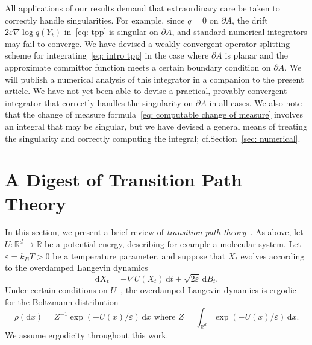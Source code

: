 \documentclass[reqno]{amsart}
\newcommand{\Real}{\mathbb{R}}
\newcommand{\eps}{\varepsilon}
\newcommand{\1}{\mathds{1}}
\renewcommand{\d}{\mathrm{d}}
\newcommand{\grad}{\nabla}
\theoremstyle{definition}
\theoremstyle{remark}
\begin{document}

All applications of our results demand that extraordinary care be taken to correctly handle singularities. For example, since $q = 0$ on $\partial A$, the drift $2\eps \grad \log q (Y_t)$ in~\eqref{eq: tpp} is singular on $\partial A$, and standard numerical integrators may fail to converge. We have devised a weakly convergent operator splitting scheme for integrating~\eqref{eq: intro tpp} in the case where $\partial A$ is planar and the approximate committor function meets a certain boundary condition on $\partial A$. We will publish a numerical analysis of this integrator in a companion to the present article. We have not yet been able to devise a practical, provably convergent integrator that correctly handles the singularity on $\partial A$ in all cases. We also note that the change of measure formula~\eqref{eq: computable change of measure} involves an integral that may be singular, but we have devised a general means of treating the singularity and correctly computing the integral; cf.\@ Section~\ref{sec: numerical}.

\section{A Digest of Transition Path Theory}
\label{sec: transition path theory}

In this section, we present a brief review of \emph{transition path theory}~\cite{e_towards_2006,lu_reactive_2015}. As above, let $U: \Real^d \rightarrow \Real$ be a potential energy, describing for example a molecular system. Let $\eps = k_B T >0$ be a temperature parameter, and suppose that $X_t$ evolves according to the overdamped Langevin dynamics
\begin{equation}\label{eq: overdamped Langevin}
\d X_t = - \grad U (X_t) \, \d t + \sqrt{2 \eps} \,  \d B_t.
\end{equation}
Under certain conditions on $U$~\cite{lelievre_partial_2016}, the overdamped Langevin dynamics is ergodic for the Boltzmann distribution
\begin{equation*}
  \rho(\d x ) = Z^{-1} \exp(- U(x)/ \eps) \, \d x \text{ where } Z = \int_{\Real^d}  \exp(- U(x)/ \eps) \, \d x.
\end{equation*}
We assume ergodicity throughout this work. 
\end{document}

